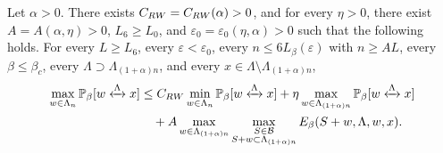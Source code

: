 \documentclass[10pt,a4paper]{amsart}
\newcommand{\connect}{\xleftrightarrow}
\begin{document}
\begin{Prop}\label{prop:regularity perco 2} Let $\alpha>0$. There exists $C_{\rm RW}=C_{\rm RW}(\alpha)>0$, and for every $\eta>0$, there exist $A=A(\alpha,\eta)>0$, $L_6\geq L_0$, and $\varepsilon_0=\varepsilon_0(\eta,\alpha)>0$ such that the following holds. For every $L\geq L_6$, every $\varepsilon<\varepsilon_0$, every $n\le 6L_\beta(\varepsilon)$  with $n\geq AL$, every $\beta\le \beta_c$, every $\Lambda\supset\Lambda_{(1+\alpha)n}$, and every $x\in \Lambda\setminus \Lambda_{(1+\alpha)n}$,
\begin{align}
\max_{w\in \Lambda_n}\mathbb P_\beta[w\connect{\Lambda\:}x]&\le C_{\rm RW}\min_{w\in \Lambda_n}\mathbb P_\beta[w\connect{\Lambda\:}x]+\eta \max_{w\in \Lambda_{(1+\alpha)n}}\mathbb P_\beta[w\connect{\Lambda\:}x]\notag
\\&\quad+A\max_{w\in \Lambda_{(1+\alpha)n}}\max_{\substack{S\in \mathcal B\\S+w\subset \Lambda_{(1+\alpha)n}}}{E}_\beta(S+w, \Lambda,w,x).
\end{align}
\end{Prop}
\end{document}
